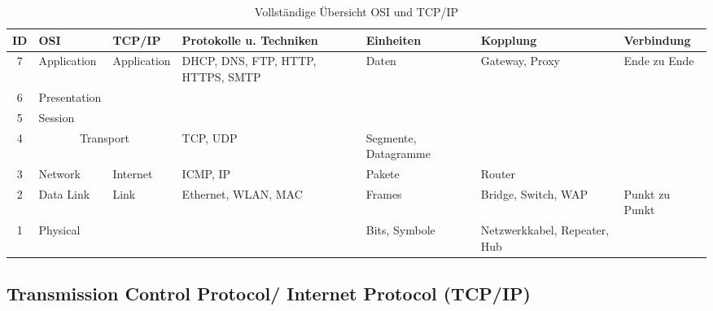 \begin{table}
    [H]
    \centering
    \begin{tabularx}{\textwidth}{|c|l|l|>{\raggedright\arraybackslash}X|>{\raggedright\arraybackslash}X|>{\raggedright\arraybackslash}X|>{\raggedright\arraybackslash}X|}
        \hline
        \textbf{ID} & \textbf{OSI}                     & \textbf{TCP/IP} & \textbf{Protokolle u. Techniken}  & \textbf{Einheiten} & \textbf{Kopplung}            & \textbf{Verbindung} \\\hline
        7           & Application                      & Application     & DHCP, DNS, FTP, HTTP, HTTPS, SMTP & Daten              & Gateway, Proxy               & Ende zu Ende        \\\cline{1-2}
        6           & Presentation                     &                 &                                   &                    &                              &                     \\\cline{1-2}
        5           & Session                          &                 &                                   &                    &                              &                     \\\cline{1-5}
        4           & \multicolumn{2}{c|}{Transport  } & TCP, UDP        & Segmente, Datagramme              &                    &                                                    \\\cline{1-6}
        3           & Network                          & Internet        & ICMP, IP                          & Pakete             & Router                       &                     \\\cline{1-7}
        2           & Data Link                        & Link            & Ethernet, WLAN, MAC               & Frames             & Bridge, Switch, WAP          & Punkt zu Punkt      \\\cline{1-2}\cline{5-6}
        1           & Physical                         &                 &                                   & Bits, Symbole      & Netzwerkkabel, Repeater, Hub &                     \\\hline
    \end{tabularx}
    \caption{Vollständige Übersicht OSI und TCP/IP}
\end{table}

\subsection{Transmission Control Protocol/ Internet Protocol (TCP/IP)}

